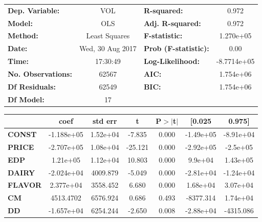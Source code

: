 \begin{center}
\begin{tabular}{lclc}
\toprule
\textbf{Dep. Variable:}    &        VOL         & \textbf{  R-squared:         } &      0.972    \\
\textbf{Model:}            &       OLS        & \textbf{  Adj. R-squared:    } &      0.972    \\
\textbf{Method:}           &  Least Squares   & \textbf{  F-statistic:       } &  1.270e+05    \\
\textbf{Date:}             & Wed, 30 Aug 2017 & \textbf{  Prob (F-statistic):} &      0.00     \\
\textbf{Time:}             &     17:30:49     & \textbf{  Log-Likelihood:    } & -8.7714e+05   \\
\textbf{No. Observations:} &       62567      & \textbf{  AIC:               } &  1.754e+06    \\
\textbf{Df Residuals:}     &       62549      & \textbf{  BIC:               } &  1.754e+06    \\
\textbf{Df Model:}         &          17      & \textbf{                     } &               \\
\bottomrule
\end{tabular}
\begin{tabular}{lcccccc}
               & \textbf{coef} & \textbf{std err} & \textbf{t} & \textbf{P$>$$|$t$|$} & \textbf{[0.025} & \textbf{0.975]}  \\
\midrule
\textbf{CONST} &   -1.188e+05  &     1.52e+04     &    -7.835  &         0.000        &    -1.49e+05    &    -8.91e+04     \\
\textbf{PRICE}    &   -2.707e+05  &     1.08e+04     &   -25.121  &         0.000        &    -2.92e+05    &     -2.5e+05     \\
\textbf{EDP}    &     1.21e+05  &     1.12e+04     &    10.803  &         0.000        &      9.9e+04    &     1.43e+05     \\
\textbf{DAIRY}    &   -2.024e+04  &     4009.879     &    -5.049  &         0.000        &    -2.81e+04    &    -1.24e+04     \\
\textbf{FLAVOR}    &    2.377e+04  &     3558.452     &     6.680  &         0.000        &     1.68e+04    &     3.07e+04     \\
\textbf{CM}    &    4513.4702  &     6576.924     &     0.686  &         0.493        &    -8377.314    &     1.74e+04     \\
\textbf{DD}    &   -1.657e+04  &     6254.244     &    -2.650  &         0.008        &    -2.88e+04    &    -4315.086     \\

\end{tabular}
\end{center}
